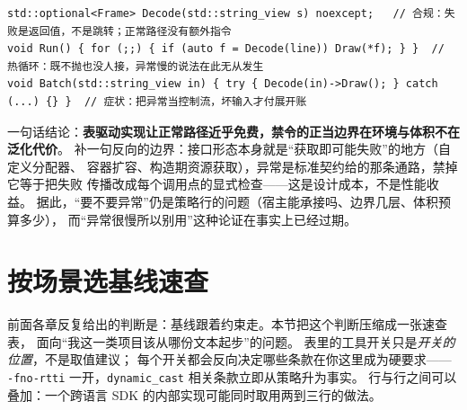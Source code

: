 \documentclass[12pt,a4paper,fontset=fandol]{ctexbook}
\newcommand{\Tp}[1]{\texttt{#1}}
\newcommand{\Bk}{\discretionary{}{}{}}
\begin{document}
\begin{lstlisting}[style=cppstyle,caption={异常：边界集中转换与把它当控制流并置},label={lst:apx-exception}]
std::optional<Frame> Decode(std::string_view s) noexcept;   // 合规：失败是返回值，不是跳转；正常路径没有额外指令
void Run() { for (;;) { if (auto f = Decode(line)) Draw(*f); } }  // 热循环：既不抛也没人接，异常慢的说法在此无从发生
void Batch(std::string_view in) { try { Decode(in)->Draw(); } catch (...) {} }  // 症状：把异常当控制流，坏输入才付展开账
\end{lstlisting}

一句话结论：\textbf{表驱动实现让正常路径近乎免费，禁令的正当边界在环境与体积不在泛化代价}。
补一句反向的边界：接口形态本身就是``获取即可能失败''的地方（自定义分配器、
容器扩容、构造期资源获取），异常是标准契约给的那条通路，禁掉它等于把失败
传播改成每个调用点的显式检查——这是设计成本，不是性能收益。
据此，``要不要异常''仍是策略行的问题（宿主能承接吗、边界几层、体积预算多少），
而``异常很慢所以别用''这种论证在事实上已经过期。

\section{按场景选基线速查}
\label{sec:apx-baseline}

前面各章反复给出的判断是：基线跟着约束走。本节把这个判断压缩成一张速查表，
面向``我这一类项目该从哪份文本起步''的问题。
表里的工具开关只是\emph{开关的位置}，不是取值建议；
每个开关都会反向决定哪些条款在你这里成为硬要求——
\Tp{-fno-rtti} 一开，\Tp{dynamic\_{\Bk}cast} 相关条款立即从策略升为事实。
行与行之间可以叠加：一个跨语言 SDK 的内部实现可能同时取用两到三行的做法。
\end{document}
